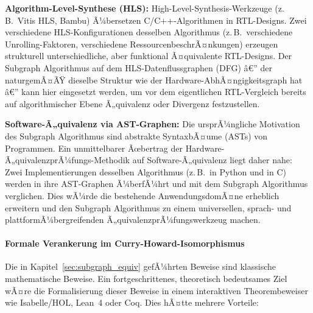 ﻿\documentclass[12pt,a4paper]{report}
\begin{document}
\textbf{Algorithm-Level-Synthese (HLS):} High-Level-Synthesis-Werkzeuge (z.\,B.\ Vitis HLS,
Bambu) Ã¼bersetzen C/C++-Algorithmen in RTL-Designs. Zwei verschiedene
HLS-Konfigurationen desselben Algorithmus (z.\,B.\ verschiedene Unrolling-Faktoren,
verschiedene RessourcenbeschrÃ¤nkungen) erzeugen strukturell unterschiedliche, aber
funktional Ã¤quivalente RTL-Designs. Der Subgraph Algorithmus auf dem HLS-Datenflussgraphen
(DFG) â€” der naturgemÃ¤ÃŸ dieselbe Struktur wie der Hardware-AbhÃ¤ngigkeitsgraph hat â€”
kann hier eingesetzt werden, um vor dem eigentlichen RTL-Vergleich bereits auf
algorithmischer Ebene Ã„quivalenz oder Divergenz festzustellen.

\textbf{Software-Ã„quivalenz via AST-Graphen:} Die ursprÃ¼ngliche Motivation des Subgraph
Algorithmus \cite{subgraph2026} sind abstrakte SyntaxbÃ¤ume (ASTs) von Programmen.
Ein unmittelbarer Ãœbertrag der Hardware-Ã„quivalenzprÃ¼fungs-Methodik auf
Software-Ã„quivalenz liegt daher nahe: Zwei Implementierungen desselben Algorithmus
(z.\,B.\ in Python und in C) werden in ihre AST-Graphen Ã¼berfÃ¼hrt und mit dem Subgraph
Algorithmus verglichen. Dies wÃ¼rde die bestehende AnwendungsdomÃ¤ne erheblich
erweitern und den Subgraph Algorithmus zu einem universellen, sprach- und
plattformÃ¼bergreifenden Ã„quivalenzprÃ¼fungswerkzeug machen.

\paragraph{Formale Verankerung im Curry-Howard-Isomorphismus}

Die in Kapitel~\ref{sec:subgraph_equiv} gefÃ¼hrten Beweise sind klassische
mathematische Beweise. Ein fortgeschrittenes, theoretisch bedeutsames Ziel wÃ¤re die
Formalisierung dieser Beweise in einem interaktiven Theorembeweiser wie Isabelle/HOL,
Lean~4 oder Coq. Dies hÃ¤tte mehrere Vorteile:
\end{document}
